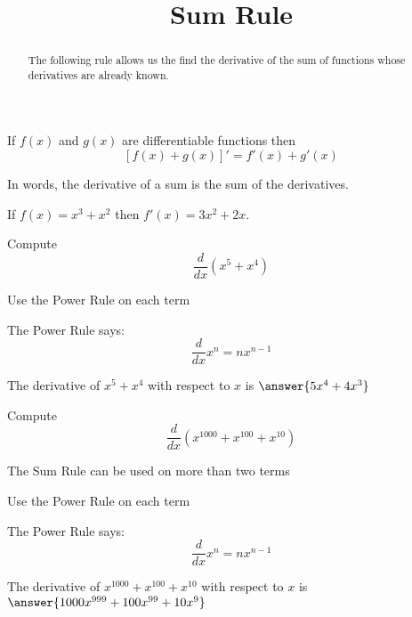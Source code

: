 \documentclass[handout]{ximera}
\title{Sum Rule}
\begin{document}
\begin{abstract}
The following rule allows us the find the derivative of the sum of functions 
whose derivatives are already known.
\end{abstract}

\maketitle

\begin{theorem} If $f(x)$ and $g(x)$ are differentiable functions then
\[[f(x) + g(x)]' =  f'(x) +  g'(x)\]
\end{theorem}

In words, the derivative of a sum is the sum of the derivatives.


\begin{example} %
If $f(x) = x^3 + x^2$ then $f'(x) = 3x^2 + 2x$.
\end{example}

\begin{problem} %
  Compute 
  \[
  \frac{d}{dx} (x^5 + x^4)
  \]
  
    \begin{hint}
      Use the Power Rule on each term
    \end{hint}
    \begin{hint}
      The Power Rule says:
      \[
      \frac{d}{dx} x^n = nx^{n-1}
      \]
    \end{hint}    
		The derivative of $x^5 + x^4$ with respect to $x$ is
		 $\answer{5x^4 + 4x^3}$
	
\end{problem}

\begin{problem} %
  Compute 
  \[
  \frac{d}{dx} (x^{1000} + x^{100} + x^{10})
  \]
  
    \begin{hint}
		  The Sum Rule can be used on more than two terms
		\end{hint}
		\begin{hint}
      Use the Power Rule on each term
    \end{hint}
    \begin{hint}
      The Power Rule says:
      \[
      \frac{d}{dx} x^n = nx^{n-1}
      \]
    \end{hint}    
		The derivative of $x^{1000} + x^{100} + x^{10}$ with respect to $x$ is
		 $\answer{1000x^{999} + 100x^{99} + 10x^9}$
	
\end{problem}
\end{document}
